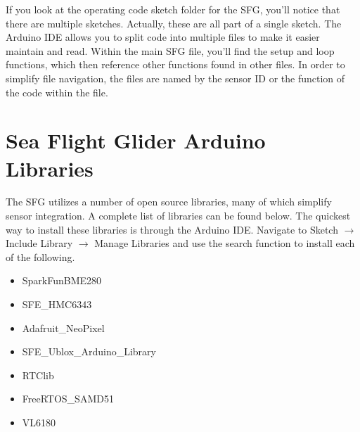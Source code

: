 If you look at the operating code sketch folder for the SFG, you'll notice that there are multiple sketches. Actually, these are all part of a single sketch. The Arduino IDE allows you to split code into multiple files to make it easier maintain and read. Within the main SFG file, you'll find the setup and loop functions, which then reference other functions found in other files. In order to simplify file navigation, the files are named by the sensor ID or the function of the code within the file.

\section{Sea Flight Glider Arduino Libraries}
The SFG utilizes a number of open source libraries, many of which simplify sensor integration. A complete list of libraries can be found below. The quickest way to install these libraries is through the Arduino IDE. Navigate to Sketch $\rightarrow$ Include Library $\rightarrow$ Manage Libraries and use the search function to install each of the following.

\begin{itemize}
	\item SparkFunBME280
	\item SFE\_HMC6343
	\item Adafruit\_NeoPixel
	\item SFE\_Ublox\_Arduino\_Library
	\item RTClib
	\item FreeRTOS\_SAMD51
	\item VL6180
\end{itemize}